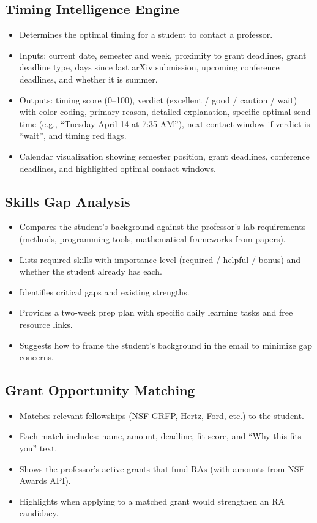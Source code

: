 \documentclass{article}
\begin{document}
\subsection{Timing Intelligence Engine}
\begin{itemize}
  \item Determines the optimal timing for a student to contact a professor.
  \item Inputs: current date, semester and week, proximity to grant deadlines,
        grant deadline type, days since last arXiv submission, upcoming conference
        deadlines, and whether it is summer.
  \item Outputs: timing score (0--100), verdict (excellent / good / caution / wait)
        with color coding, primary reason, detailed explanation, specific optimal
        send time (e.g., ``Tuesday April 14 at 7:35 AM''), next contact window
        if verdict is ``wait'', and timing red flags.
  \item Calendar visualization showing semester position, grant deadlines,
        conference deadlines, and highlighted optimal contact windows.
\end{itemize}

\subsection{Skills Gap Analysis}
\begin{itemize}
  \item Compares the student's background against the professor's lab requirements
        (methods, programming tools, mathematical frameworks from papers).
  \item Lists required skills with importance level (required / helpful / bonus)
        and whether the student already has each.
  \item Identifies critical gaps and existing strengths.
  \item Provides a two-week prep plan with specific daily learning tasks and
        free resource links.
  \item Suggests how to frame the student's background in the email to
        minimize gap concerns.
\end{itemize}

\subsection{Grant Opportunity Matching}
\begin{itemize}
  \item Matches relevant fellowships (NSF GRFP, Hertz, Ford, etc.) to the student.
  \item Each match includes: name, amount, deadline, fit score, and
        ``Why this fits you'' text.
  \item Shows the professor's active grants that fund RAs (with amounts
        from NSF Awards API).
  \item Highlights when applying to a matched grant would strengthen an
        RA candidacy.
\end{itemize}
\end{document}
